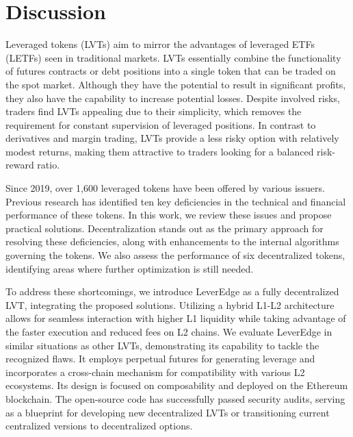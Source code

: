 \section{Discussion}
Leveraged tokens (LVTs) aim to mirror the advantages of leveraged ETFs (LETFs) seen in traditional markets. LVTs essentially combine the functionality of futures contracts or debt positions into a single token that can be traded on the spot market. Although they have the potential to result in significant profits, they also have the capability to increase potential losses. Despite involved risks, traders find LVTs appealing due to their simplicity, which removes the requirement for constant supervision of leveraged positions. In contrast to derivatives and margin trading, LVTs provide a less risky option with relatively modest returns, making them attractive to traders looking for a balanced risk-reward ratio.

Since 2019, over 1,600 leveraged tokens have been offered by various issuers. Previous research has identified ten key deficiencies in the technical and financial performance of these tokens. In this work, we review these issues and propose practical solutions. Decentralization stands out as the primary approach for resolving these deficiencies, along with enhancements to the internal algorithms governing the tokens. We also assess the performance of six decentralized tokens, identifying areas where further optimization is still needed.

To address these shortcomings, we introduce LeverEdge as a fully decentralized LVT, integrating the proposed solutions. Utilizing a hybrid L1-L2 architecture allows for seamless interaction with higher L1 liquidity while taking advantage of the faster execution and reduced fees on L2 chains. We evaluate LeverEdge in similar situations as other LVTs, demonstrating its capability to tackle the recognized flaws. It employs perpetual futures for generating leverage and incorporates a cross-chain mechanism for compatibility with various L2 ecosystems. Its design is focused on composability and deployed on the Ethereum blockchain. The open-source code has successfully passed security audits, serving as a blueprint for developing new decentralized LVTs or transitioning current centralized versions to decentralized options.